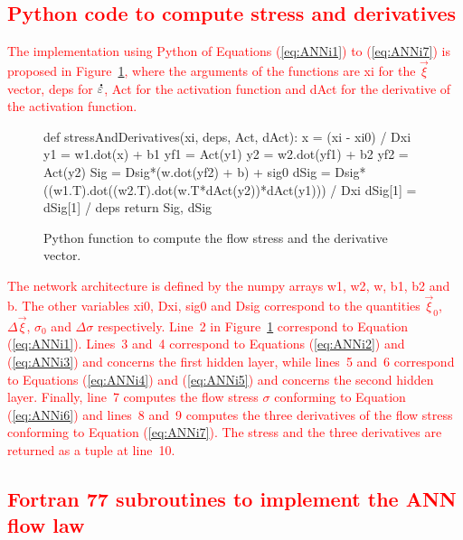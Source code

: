 \documentclass[algorithms,article,submit,pdftex,oneauthors]{Definitions/mdpi}
\DeclareRobustCommand{\mdot}[1]{\accentset{\mbox{\bfseries .}}{#1}}
\DeclareRobustCommand{\var}[1]{\textsf{#1}}
\begin{document}
\textcolor{red}{\section[\appendixname~\thesection]{Python code to compute stress and derivatives\label{sec:Appendix1}}}

\textcolor{red}{The implementation using Python of Equations (\ref{eq:ANNi1}) to (\ref{eq:ANNi7}) is proposed in Figure~\ref{fig:PythonStress}, where the arguments of the functions are \var{xi} for the $\overrightarrow{\xi}$ vector, \var{deps} for $\mdot{\varepsilon}$, \var{Act} for the activation function and \var{dAct} for the derivative of the activation function.}
\begin{figure}[h!]
\begin{PythonListing}
def stressAndDerivatives(xi, deps, Act, dAct):
  x = (xi - xi0) / Dxi
  y1 = w1.dot(x) + b1
  yf1 = Act(y1)
  y2 = w2.dot(yf1) + b2
  yf2 = Act(y2)
  Sig = Dsig*(w.dot(yf2) + b) + sig0
  dSig = Dsig*((w1.T).dot((w2.T).dot(w.T*dAct(y2))*dAct(y1))) / Dxi
  dSig[1] = dSig[1] / deps
  return Sig, dSig
\end{PythonListing}
\caption{Python function to compute the flow stress and the derivative vector.\label{fig:PythonStress}}
\end{figure}
\textcolor{red}{The network architecture is defined by the numpy arrays \var{w1}, \var{w2}, \var{w}, \var{b1}, \var{b2} and \var{b}.
The other variables \var{xi0}, \var{Dxi}, \var{sig0} and \var{Dsig} correspond to the quantities $\overrightarrow{\xi}_{0}$, $\Delta\overrightarrow{\xi}$, $\sigma_{0}$ and $\Delta\sigma$ respectively.
Line~2 in Figure~\ref{fig:PythonStress} correspond to Equation (\ref{eq:ANNi1}). Lines~3 and~4 correspond to Equations (\ref{eq:ANNi2}) and (\ref{eq:ANNi3}) and concerns the first hidden layer, while lines~5 and~6 correspond to Equations (\ref{eq:ANNi4}) and (\ref{eq:ANNi5}) and concerns the second hidden layer. Finally, line~7 computes the flow stress $\sigma$ conforming to Equation (\ref{eq:ANNi6}) and lines~8 and~9 computes the three derivatives of the flow stress conforming to Equation (\ref{eq:ANNi7}). The stress and the three derivatives are returned as a tuple at line~10.}

\textcolor{red}{\section[\appendixname~\thesection]{Fortran 77 subroutines to implement the ANN flow law\label{sec:Appendix2}}}
\end{document}
